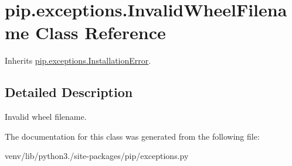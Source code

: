 \hypertarget{classpip_1_1exceptions_1_1_invalid_wheel_filename}{}\section{pip.\+exceptions.\+Invalid\+Wheel\+Filename Class Reference}
\label{classpip_1_1exceptions_1_1_invalid_wheel_filename}


Inherits \hyperlink{classpip_1_1exceptions_1_1_installation_error}{pip.\+exceptions.\+Installation\+Error}.



\subsection{Detailed Description}
\begin{DoxyVerb}Invalid wheel filename.\end{DoxyVerb}
 

The documentation for this class was generated from the following file\+:\begin{DoxyCompactItemize}
\item 
venv/lib/python3./site-\/packages/pip/exceptions.\+py\end{DoxyCompactItemize}
